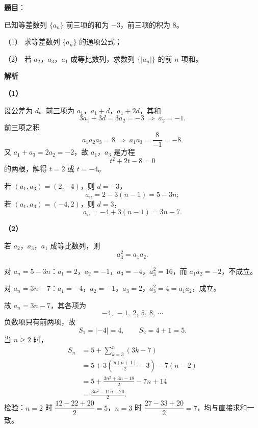 \begin{answer}

\textbf{题目}：

已知等差数列 $\{a_n\}$ 前三项的和为 $-3$，前三项的积为 $8$。

（1） 求等差数列 $\{a_n\}$ 的通项公式；

（2） 若 $a_2$，$a_3$，$a_1$ 成等比数列，求数列 $\{|a_n|\}$ 的前 $n$ 项和。

\textbf{解析}

\textbf{（1）}

设公差为 $d$。前三项为 $a_1$，$a_1+d$，$a_1+2d$，其和
\nopagebreak[4]
\[3a_1+3d=3a_2=-3\ \Longrightarrow\ a_2=-1.\]
前三项之积
\nopagebreak[4]
\[a_1a_2a_3=8\ \Longrightarrow\ a_1a_3=\frac{8}{-1}=-8.\]
又 $a_1+a_3=2a_2=-2$，故 $a_1$，$a_3$ 是方程
\nopagebreak[4]
\[t^2+2t-8=0\]
的两根，解得 $t=2$ 或 $t=-4$。

若 $(a_1,a_3)=(2,-4)$，则 $d=-3$，
\nopagebreak[4]
\[a_n=2-3(n-1)=5-3n;\]
若 $(a_1,a_3)=(-4,2)$，则 $d=3$，
\nopagebreak[4]
\[a_n=-4+3(n-1)=3n-7.\]

\textbf{（2）}

若 $a_2$，$a_3$，$a_1$ 成等比数列，则
\nopagebreak[4]
\[a_3^2=a_1a_2.\]

对 $a_n=5-3n$：$a_1=2$，$a_2=-1$，$a_3=-4$，$a_3^2=16$，而 $a_1a_2=-2$，不成立。

对 $a_n=3n-7$：$a_1=-4$，$a_2=-1$，$a_3=2$，$a_3^2=4=a_1a_2$，成立。

故 $a_n=3n-7$，其各项为
\nopagebreak[4]
\[-4,\ -1,\ 2,\ 5,\ 8,\ \cdots\]
负数项只有前两项，故
\nopagebreak[4]
\[S_1=|-4|=4,\qquad S_2=4+1=5.\]
当 $n\geqslant2$ 时，
\nopagebreak[4]
\[\begin{aligned}
S_n&=5+\sum_{k=3}^{n}(3k-7)\\
&=5+3\left(\frac{n(n+1)}{2}-3\right)-7(n-2)\\
&=5+\frac{3n^2+3n-18}{2}-7n+14\\
&=\frac{3n^2-11n+20}{2}.
\end{aligned}\]
检验：$n=2$ 时 $\dfrac{12-22+20}{2}=5$，$n=3$ 时 $\dfrac{27-33+20}{2}=7$，均与直接求和一致。



\end{answer}
